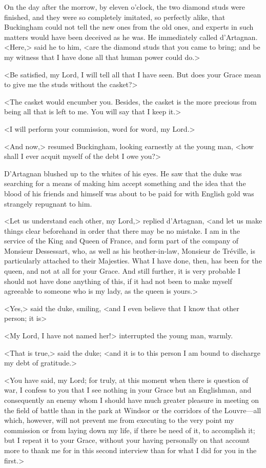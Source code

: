 On the day after the morrow, by eleven o'clock, the two diamond studs were finished, and they were so completely imitated, so perfectly alike, that Buckingham could not tell the new ones from the old ones, and experts in such matters would have been deceived as he was. He immediately called d'Artagnan. <Here,> said he to him, <are the diamond studs that you came to bring; and be my witness that I have done all that human power could do.> 

<Be satisfied, my Lord, I will tell all that I have seen. But does your Grace mean to give me the studs without the casket?> 

<The casket would encumber you. Besides, the casket is the more precious from being all that is left to me. You will say that I keep it.> 

<I will perform your commission, word for word, my Lord.> 

<And now,> resumed Buckingham, looking earnestly at the young man, <how shall I ever acquit myself of the debt I owe you?> 

D'Artagnan blushed up to the whites of his eyes. He saw that the duke was searching for a means of making him accept something and the idea that the blood of his friends and himself was about to be paid for with English gold was strangely repugnant to him. 

<Let us understand each other, my Lord,> replied d'Artagnan, <and let us make things clear beforehand in order that there may be no mistake. I am in the service of the King and Queen of France, and form part of the company of Monsieur Dessessart, who, as well as his brother-in-law, Monsieur de Tréville, is particularly attached to their Majesties. What I have done, then, has been for the queen, and not at all for your Grace. And still further, it is very probable I should not have done anything of this, if it had not been to make myself agreeable to someone who is my lady, as the queen is yours.> 

<Yes,> said the duke, smiling, <and I even believe that I know that other person; it is\longdash> 

<My Lord, I have not named her!> interrupted the young man, warmly. 

<That is true,> said the duke; <and it is to this person I am bound to discharge my debt of gratitude.> 

<You have said, my Lord; for truly, at this moment when there is question of war, I confess to you that I see nothing in your Grace but an Englishman, and consequently an enemy whom I should have much greater pleasure in meeting on the field of battle than in the park at Windsor or the corridors of the Louvre---all which, however, will not prevent me from executing to the very point my commission or from laying down my life, if there be need of it, to accomplish it; but I repeat it to your Grace, without your having personally on that account more to thank me for in this second interview than for what I did for you in the first.> 

